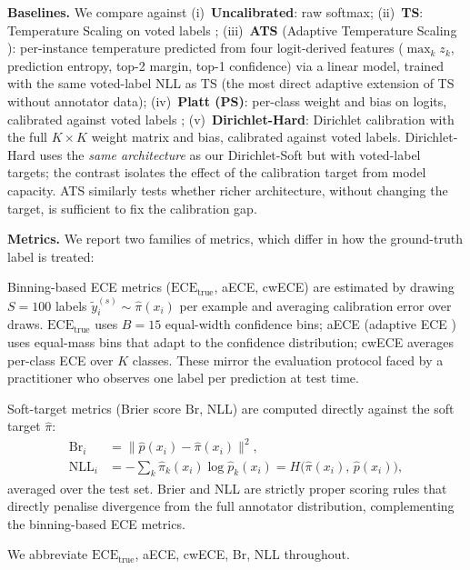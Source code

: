 \documentclass[10pt,journal,compsoc]{IEEEtran}
\newcommand{\phat}{\hat{p}}
\newcommand{\pihat}{\hat{\pi}}
\newcommand{\ECE}{\mathrm{ECE}}
\newcommand{\ECEtrue}{\ECE_{\text{true}}}
\begin{document}
\noindent\textbf{Baselines.}
We compare against (i)~\textbf{Uncalibrated}: raw softmax; (ii)~\textbf{TS}: Temperature Scaling on voted labels \cite{guo2017calibration}; (iii)~\textbf{ATS} (Adaptive Temperature Scaling \cite{joy2023sample}): per-instance temperature predicted from four logit-derived features ($\max_k z_k$, prediction entropy, top-2 margin, top-1 confidence) via a linear model, trained with the same voted-label NLL as TS (the most direct adaptive extension of TS without annotator data); (iv)~\textbf{Platt (PS)}: per-class weight and bias on logits, calibrated against voted labels \cite{platt1999probabilistic,kull2019beyond}; (v)~\textbf{Dirichlet-Hard}: Dirichlet calibration \cite{kull2019beyond} with the full $K\times K$ weight matrix and bias, calibrated against voted labels.  Dirichlet-Hard uses the \emph{same architecture} as our Dirichlet-Soft but with voted-label targets; the contrast isolates the effect of the calibration target from model capacity.  ATS similarly tests whether richer architecture, without changing the target, is sufficient to fix the calibration gap.

\noindent\textbf{Metrics.}
We report two families of metrics, which differ in how the ground-truth label is treated:

Binning-based ECE metrics ($\ECEtrue$, aECE, cwECE) are estimated by drawing $S=100$ labels $\tilde{y}^{(s)}_i \sim \pihat(x_i)$ per example and averaging calibration error over draws.
$\ECEtrue$ uses $B=15$ equal-width confidence bins; aECE (adaptive ECE \cite{nixon2019measuring}) uses equal-mass bins that adapt to the confidence distribution; cwECE \cite{kull2019beyond} averages per-class ECE over $K$ classes.
These mirror the evaluation protocol faced by a practitioner who observes one label per prediction at test time.

Soft-target metrics (Brier score $\mathrm{Br}$, NLL) are computed directly against the soft target $\pihat$:
\begin{align}
  \mathrm{Br}_i &= \|\phat(x_i) - \pihat(x_i)\|^2, \label{eq:soft-metrics}\\
  \mathrm{NLL}_i &= -\sum_k \pihat_k(x_i)\log\phat_k(x_i)
    = H\!\bigl(\pihat(x_i),\,\phat(x_i)\bigr), \nonumber
\end{align}
averaged over the test set.
Brier and NLL are strictly proper scoring rules that directly penalise divergence from the full annotator distribution, complementing the binning-based ECE metrics.

We abbreviate $\ECEtrue$, aECE, cwECE, Br, NLL throughout.
\end{document}
